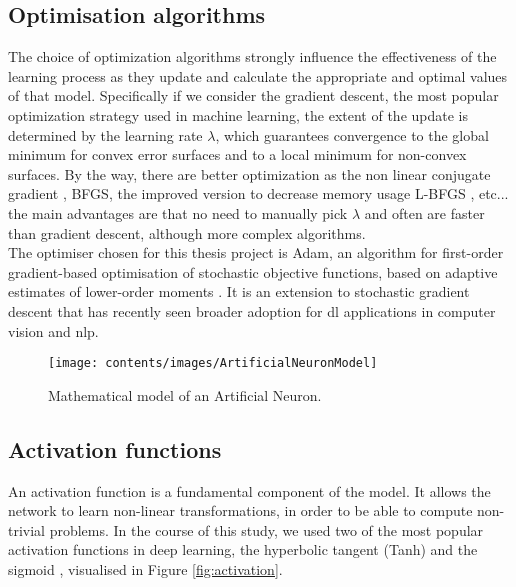 \subsection{Optimisation algorithms}
\label{nn:optmalgo}
The choice of optimization algorithms strongly influence the effectiveness of the learning process as they update and calculate the appropriate and optimal values of that model. Specifically if we consider the gradient descent, the most popular optimization strategy used in machine learning, the extent of the update is determined by the learning rate $\lambda$, which guarantees convergence to the global minimum for convex error surfaces and to a local minimum for non-convex surfaces. By the way, there are better optimization as the non linear conjugate gradient \cite[]{conjugategradient}, BFGS, the improved version to decrease memory usage L-BFGS \cite[]{saputro2017limited}, etc... the main advantages are that no need to manually pick $\lambda$ and often are faster than gradient descent, although more complex algorithms. \\

\noindent The optimiser chosen for this thesis project is Adam, an algorithm for first-order gradient-based optimisation of stochastic objective functions, based on adaptive estimates of lower-order moments \cite[]{kingma2017adam}. It is an extension to stochastic gradient descent that has recently seen broader adoption for \gls{dl} applications in computer vision and \gls{nlp}.



\iffalse

\begin{figure}[htb]
	\centering
	\texttt{[image: contents/images/ArtificialNeuronModel]}
	\caption{Mathematical model of an Artificial Neuron.}
	\label{fig:neuron}
	\vspace{-0.5cm}
\end{figure}



\subsection{Activation functions}
\label{subsec:activationfun}

An activation function is a fundamental component of the model. It allows the 
network to learn non-linear transformations, in order to be able to compute 
non-trivial problems.
In the course of this study, we used two of the most popular activation functions  
in deep learning, the {hyperbolic tangent} (Tanh) \cite[][]{kalman1992tanh} 
and the {sigmoid} \cite[][]{han1995influence}, visualised in Figure 
\ref{fig:activation}.

